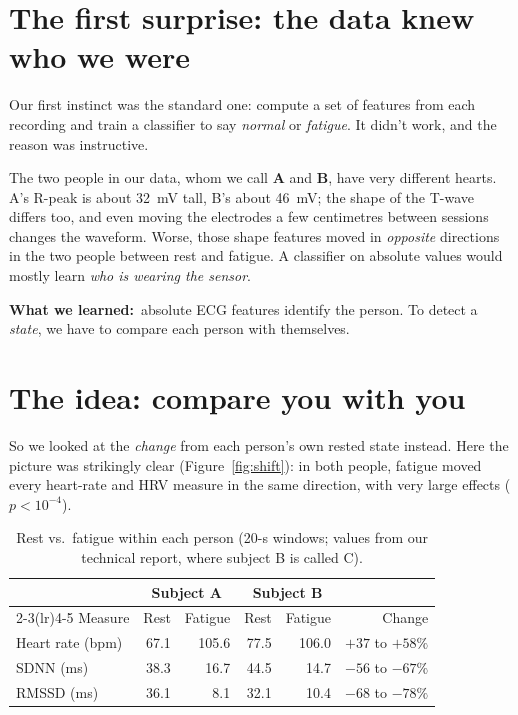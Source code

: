 \documentclass[11pt]{article}
\newcommand{\rowband}{\rowcolors{2}{bblight}{white}}
\newcommand{\lesson}[1]{\begin{lessonbox}\textbf{\color{bbnavy}What we learned:}\ #1\end{lessonbox}}
\begin{document}
\section{The first surprise: the data knew who we were}

Our first instinct was the standard one: compute a set of features from each recording and train a
classifier to say \emph{normal} or \emph{fatigue}. It didn't work, and the reason was instructive.

The two people in our data, whom we call \textbf{A} and \textbf{B}, have very different hearts. A's R-peak
is about 32~mV tall, B's about 46~mV; the shape of the T-wave differs too, and even moving the electrodes a
few centimetres between sessions changes the waveform. Worse, those shape features moved in
\emph{opposite} directions in the two people between rest and fatigue. A classifier on absolute values
would mostly learn \emph{who is wearing the sensor}.

\lesson{absolute ECG features identify the person. To detect a \emph{state}, we have to compare each person
with themselves.}

\section{The idea: compare you with you}

So we looked at the \emph{change} from each person's own rested state instead. Here the picture was
strikingly clear (Figure~\ref{fig:shift}): in both people, fatigue moved every heart-rate and HRV measure in
the same direction, with very large effects ($p<10^{-4}$).

\begin{table}[h]
\centering
\caption{Rest vs.\ fatigue within each person (20-s windows; values from our technical report, where
subject B is called C).}
\label{tab:shift}
\rowband\begin{tabular}{lrrrrr}
\toprule
 & \multicolumn{2}{c}{Subject A} & \multicolumn{2}{c}{Subject B} & \\
\cmidrule(lr){2-3}\cmidrule(lr){4-5}
Measure & Rest & Fatigue & Rest & Fatigue & Change \\
\midrule
Heart rate (bpm) & 67.1 & 105.6 & 77.5 & 106.0 & $+37$ to $+58\%$ \\
SDNN (ms)        & 38.3 & 16.7  & 44.5 & 14.7  & $-56$ to $-67\%$ \\
RMSSD (ms)       & 36.1 & 8.1   & 32.1 & 10.4  & $-68$ to $-78\%$ \\
\bottomrule
\end{tabular}
\end{table}
\end{document}
